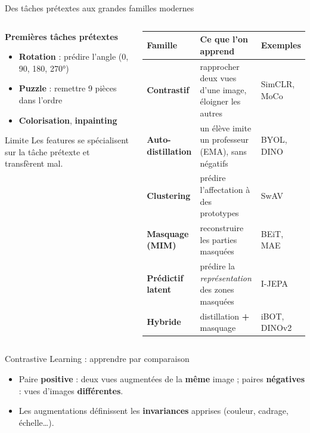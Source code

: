 \documentclass[aspectratio=169,10pt]{beamer}
\newcommand{\src}[1]{\par\vfill\hfill{\tiny\color{grisE}#1}}
\begin{document}
\begin{frame}{Des tâches prétextes aux grandes familles modernes}
  \begin{columns}[T]
    \begin{column}{0.36\textwidth}
      \textbf{Premières tâches prétextes}
      \begin{itemize}\small
        \item \textbf{Rotation} : prédire l'angle (0, 90, 180, 270°)
        \item \textbf{Puzzle} : remettre 9 pièces dans l'ordre
        \item \textbf{Colorisation}, \textbf{inpainting}
      \end{itemize}
      \vspace{1mm}
      \begin{alertblock}{Limite}
        \footnotesize Les features se spécialisent sur la tâche prétexte et transfèrent mal.
      \end{alertblock}
    \end{column}
    \begin{column}{0.62\textwidth}
      \footnotesize
      \begin{tabularx}{\linewidth}{@{}>{\bfseries}l L l@{}}
        \toprule
        Famille & Ce que l'on apprend & Exemples\\
        \midrule
        \textcolor{bleuE}{Contrastif} & rapprocher deux vues d'une image, éloigner les autres & SimCLR, MoCo\\
        \textcolor{vertE}{Auto-distillation} & un élève imite un professeur (EMA), sans négatifs & BYOL, DINO\\
        \textcolor{bleuE}{Clustering} & prédire l'affectation à des prototypes & SwAV\\
        \textcolor{orangeE}{Masquage (MIM)} & reconstruire les parties masquées & BEiT, MAE\\
        \textcolor{violetE}{Prédictif latent} & prédire la \emph{représentation} des zones masquées & I-JEPA\\
        \midrule
        \textcolor{vertE}{Hybride} & distillation \textbf{+} masquage & iBOT, DINOv2\\
        \bottomrule
      \end{tabularx}
    \end{column}
  \end{columns}
  \src{\citet{balestriero2023cookbook}}
\end{frame}

\begin{frame}{Contrastive Learning : apprendre par comparaison}
  \centering
  \resizebox{0.95\linewidth}{!}{}
  \vspace{3mm}
  \begin{itemize}\small
    \item Paire \textbf{positive} : deux vues augmentées de la \textbf{même} image ; paires \textbf{négatives} : vues d'images \textbf{différentes}.
    \item Les augmentations définissent les \textbf{invariances} apprises (couleur, cadrage, échelle\ldots).
  \end{itemize}
  \src{\citet{chen2020simclr}}
\end{frame}
\end{document}
